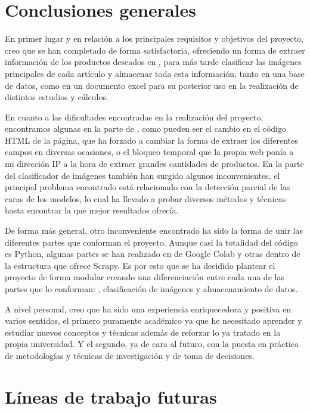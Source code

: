 
\section{Conclusiones generales}
En primer lugar y en relación a los principales requisitos y objetivos del proyecto, creo que se han completado de forma satisfactoria, ofreciendo un forma de extraer información de los productos deseados en , para más tarde clasificar las imágenes principales de cada artículo y almacenar toda esta información, tanto en una base de datos, como en un documento excel para su posterior uso en la realización de distintos estudios y cálculos.

En cuanto a las dificultades encontradas en la realización del proyecto, encontramos algunas en la parte de , como pueden ser el cambio en el código HTML de la página, que ha forzado a cambiar la forma de extraer los diferentes campos en diversas ocasiones, o el bloqueo temporal que la propia web ponía a mi dirección IP a la hora de extraer grandes cantidades de productos. En la parte del clasificador de imágenes también han surgido algunos inconvenientes, el principal problema encontrado está relacionado con la detección parcial de las caras de los modelos, lo cual ha llevado a probar diversos métodos y técnicas hasta encontrar la que mejor resultados ofrecía.

De forma más general, otro inconveniente encontrado ha sido la forma de unir las diferentes partes que conforman el proyecto. Aunque casi la totalidad del código es Python, algunas partes se han realizado en  de Google Colab y otras dentro de la estructura que ofrece Scrapy. Es por esto que se ha decidido plantear el proyecto de forma modular creando una diferenciación entre cada una de las partes que lo conforman: , clasificación de imágenes y almacenamiento de datos.

A nivel personal, creo que ha sido una experiencia enriquecedora y positiva en varios sentidos, el primero puramente académico ya que he necesitado aprender y estudiar nuevos conceptos y técnicas además de reforzar lo ya tratado en la propia universidad. Y el segundo, ya de cara al futuro, con la puesta en práctica de metodologías y técnicas de investigación y de toma de decisiones.

\section{Líneas de trabajo futuras}

